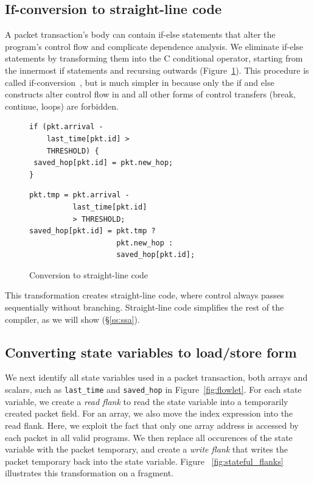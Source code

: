 \subsection{If-conversion to straight-line code}
A packet transaction's body can contain if-else statements that alter the
program's control flow and complicate dependence analysis. We eliminate if-else
statements by transforming them into the C conditional operator, starting from
the innermost if statements and recursing outwards
(Figure~\ref{fig:if_convert}). This procedure is called
if-conversion~\cite{if_conversion}, but is much simpler in \pktlanguage because
only the if and else constructs alter control flow in \pktlanguage and all
other forms of control transfers (break, continue, loops) are forbidden.
\begin{figure}[!t]
  \begin{minipage}{0.47\textwidth}
  \begin{small}
  \begin{lstlisting}[style=customc]
if (pkt.arrival -
    last_time[pkt.id] >
    THRESHOLD) {
 saved_hop[pkt.id] = pkt.new_hop;
}
  \end{lstlisting}
  \end{small}
  \end{minipage}
  \begin{minipage}{0.53\textwidth}
  \begin{small}
  \begin{lstlisting}[style=customc]
pkt.tmp = pkt.arrival -
          last_time[pkt.id]
          > THRESHOLD;
saved_hop[pkt.id] = pkt.tmp ?
                    pkt.new_hop :
                    saved_hop[pkt.id];
  \end{lstlisting}
  \end{small}
  \end{minipage}
\caption{Conversion to straight-line code}
\label{fig:if_convert}
\end{figure}

This transformation creates straight-line code, where control always passes
sequentially without branching. Straight-line code simplifies
the rest of the compiler, as we will show (\S\ref{ss:ssa}).

\subsection{Converting state variables to load/store form}

We next identify all state variables used in a packet transaction, both arrays
and scalars, such as \texttt{last\_time} and \texttt{saved\_hop} in
Figure~\ref{fig:flowlet}. For each state variable, we create a \textit{read
flank} to read the state variable into a temporarily created packet field. For
an array, we also move the index expression into the read flank. Here, we
exploit the fact that only one array address is accessed by each packet in all
valid \pktlanguage programs.  We then replace all occurences of the state
variable with the packet temporary, and create a \textit{write flank} that
writes the packet temporary back into the state variable.  Figure
~\ref{fig:stateful_flanks} illustrates this transformation on a fragment.

